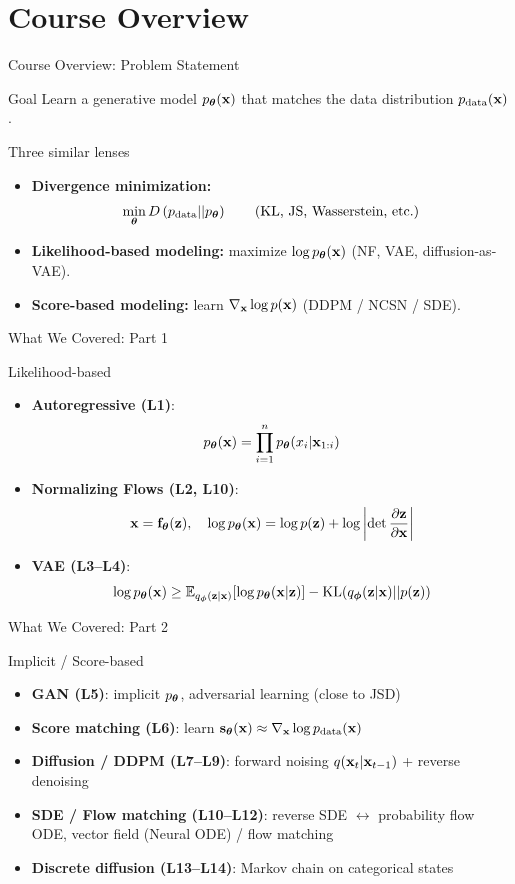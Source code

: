 \documentclass{beamer}
\begin{document}
\section{Course Overview}
\begin{frame}{Course Overview: Problem Statement}
	\begin{block}{Goal}
		Learn a generative model $p_{\boldsymbol{\theta}}(\mathbf{x})$ that matches the data distribution $p_{\text{data}}(\mathbf{x})$.
	\end{block}

	\begin{block}{Three similar lenses}
		\begin{itemize}
			\item \textbf{Divergence minimization:}
			\[
				\min_{\boldsymbol{\theta}} D\left(p_{\text{data}} || p_{\boldsymbol{\theta}}\right)
				\qquad (\text{KL, JS, Wasserstein, etc.})
			\]
			\vspace{-0.3cm}
			\item \textbf{Likelihood-based modeling:} maximize $\log p_{\boldsymbol{\theta}}(\mathbf{x})$ (NF, VAE, diffusion-as-VAE).
			\item \textbf{Score-based modeling:} learn $\nabla_{\mathbf{x}} \log p(\mathbf{x})$ (DDPM / NCSN / SDE).
		\end{itemize}
	\end{block}
\end{frame}
\begin{frame}{What We Covered: Part 1}
	\begin{block}{Likelihood-based}
		\begin{itemize}
			\item \textbf{Autoregressive (L1)}:
			\[
				p_{\boldsymbol{\theta}}(\mathbf{x})=\prod_{i=1}^n p_{\boldsymbol{\theta}}(x_i|\mathbf{x}_{1:i})
			\]
			\item \textbf{Normalizing Flows (L2, L10)}:
			\[
				\mathbf{x}=\mathbf{f}_{\boldsymbol{\theta}}(\mathbf{z}), 
				\quad 
				\log p_{\boldsymbol{\theta}}(\mathbf{x})
				=\log p(\mathbf{z})
				+\log\left|\det \frac{\partial \mathbf{z}}{\partial \mathbf{x}}\right|
			\]
			\item \textbf{VAE (L3--L4)}:
			\[
				\log p_{\boldsymbol{\theta}}(\mathbf{x})\ge \mathbb{E}_{q_{\boldsymbol{\phi}}(\mathbf{z}|\mathbf{x})}[\log p_{\boldsymbol{\theta}}(\mathbf{x}|\mathbf{z})]-\mathrm{KL}(q_{\boldsymbol{\phi}}(\mathbf{z}|\mathbf{x})||p(\mathbf{z}))
			\]
		\end{itemize}
	\end{block}
\end{frame}
\begin{frame}{What We Covered: Part 2}
	\begin{block}{Implicit / Score-based}
		\begin{itemize}
			\item \textbf{GAN (L5)}: implicit $p_{\boldsymbol{\theta}}$, adversarial learning (close to JSD)
			\item \textbf{Score matching (L6)}: learn $\mathbf{s}_{\boldsymbol{\theta}}(\mathbf{x})\approx\nabla_{\mathbf{x}}\log p_{\text{data}}(\mathbf{x})$
			\item \textbf{Diffusion / DDPM (L7--L9)}:
			forward noising $q(\mathbf{x}_t|\mathbf{x}_{t-1})$ + reverse denoising
			\item \textbf{SDE / Flow matching (L10--L12)}:
			reverse SDE $\leftrightarrow$ probability flow ODE, vector field (Neural ODE) / flow matching
			\item \textbf{Discrete diffusion (L13--L14)}:
			Markov chain on categorical states 
		\end{itemize}
	\end{block}
\end{frame}
\end{document}
